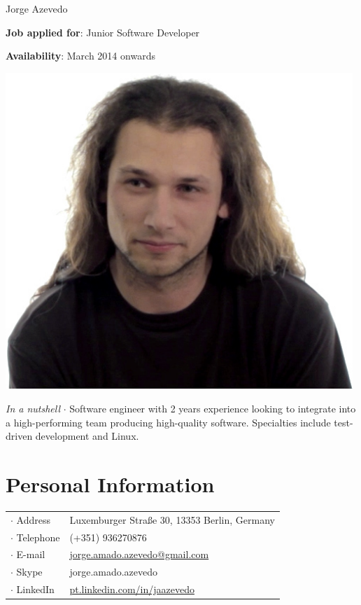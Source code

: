 



\topSection
{
	{\Huge Jorge Azevedo}

	\vspace{1.5mm}
	\vspace*{10mm}

	\textbf{Job applied for}: Junior Software Developer

	\textbf{Availability}: March 2014 onwards
} {
	\includegraphics[width=0.985\textwidth]{img/photo}
}

\emph{In a nutshell} $\cdot$ Software engineer with 2 years experience looking
to integrate into a high-performing team producing high-quality software.
Specialties include test-driven development and Linux.

\section*{Personal Information}

{
\begin{tabular}[t]{@{}l l}
	$\cdot$  Address & Luxemburger Straße 30, 13353 Berlin, Germany \\
	$\cdot$  Telephone & (+351) 936270876 \\
	$\cdot$  E-mail & \href{mailto:jorge.amado.azevedo@gmail.com}{jorge.amado.azevedo@gmail.com} \\
	$\cdot$  Skype & jorge.amado.azevedo\\
	$\cdot$  LinkedIn & \href{http://pt.linkedin.com/in/jaazevedo}{pt.linkedin.com/in/jaazevedo}\\
\end{tabular}
}

